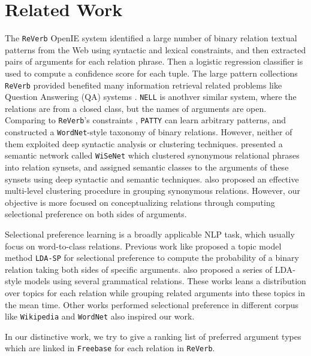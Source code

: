 \section{Related Work}
The {\tt ReVerb} OpenIE system \cite{fader2011identifying} identified a large number of
binary relation textual patterns from the Web using syntactic and lexical constraints, and then extracted pairs of arguments for each
relation phrase. Then a logistic regression classifier is used to compute a confidence score for each tuple. The large pattern collections {\tt ReVerb} provided benefited many information retrieval related problems like Question Answering (QA) systems \cite{berant2013semantic,cai2013large}. {\tt NELL} \cite{carlson2010toward} is anothver similar system, where the relations are from a closed class, but the names of arguments are open. Comparing to {\tt ReVerb}'s constraints \cite{fader2011identifying}, {\tt PATTY} \cite{nakashole2012patty} can learn arbitrary patterns, and constructed a {\tt WordNet}-style taxonomy of binary relations. However, neither of them exploited deep syntactic analysis or clustering techniques.  presented a semantic network called {\tt WiSeNet} which clustered synonymous relational phrases into relation synsets, and assigned semantic classes to the arguments of these synsets using deep syntactic and semantic techniques.
 also proposed an effective multi-level clustering procedure in grouping synonymous relations.
However, our objective is more focused on conceptualizing relations through computing selectional preference on both sides of arguments.

Selectional preference learning is a broadly applicable NLP task, which usually focus on word-to-class relations. Previous work like  proposed a topic model method {\tt LDA-SP} for selectional preference to compute the probability of a binary relation taking both sides of specific arguments.  also proposed a series of LDA-style models using several grammatical relations. These works leans a distribution over topics for each relation while grouping related arguments into these topics in the mean time. Other works performed selectional preference in different corpus \cite{agirre2002integrating,judea2012concept} like {\tt Wikipedia} and {\tt WordNet} also inspired our work.

In our distinctive work, we try to give a ranking list of preferred argument types which are linked in {\tt Freebase} \cite{bollacker2008freebase} for each relation in {\tt ReVerb}.

